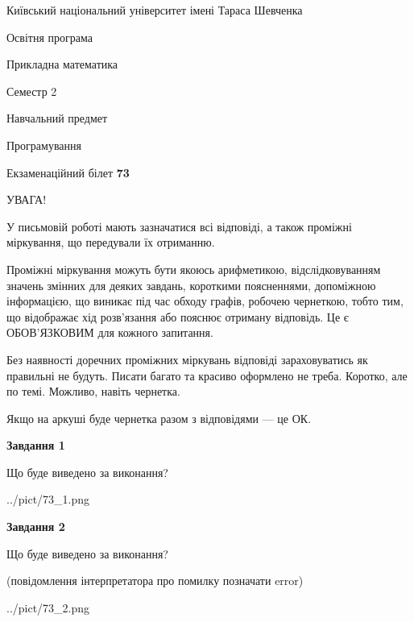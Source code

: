 \documentclass[12pt, ukrainian]{article}
\begin{document}
{{\begin {small}\par
{ \center  Київський національний університет імені Тараса Шевченка \par}
{\parbox {5 cm}{Освітня програма \hfill}{\parbox {7 cm}{Прикладна математика\hfill}}\parbox {6 cm}{\hfill Семестр 2}}\par
{\parbox {5 cm} {Навчальний предмет \hfill}\parbox {7 cm}{Програмування \hfill}\parbox {6cm}{\hfill}\par}\vspace{-7pt} \end{small}}{\center Екзаменаційний білет \No \textbf
{ 73 }\par}}
{
\begin {large}
УВАГА!

У письмовій роботі мають зазначатися всі відповіді, а також проміжні міркування, що передували їх отриманню.

Проміжні міркування можуть бути якоюсь арифметикою, відслідковуванням зна\-чень змінних для деяких завдань,
короткими поясненнями, допоміжною інформацією, що виникає під час обходу графів, робочею чернеткою,
тобто тим, що відображає хід розв’язання або пояснює отриману відповідь.
Це є ОБОВ’ЯЗКОВИМ для кожного запитання.

Без наявності доречних проміжних міркувань відповіді зараховуватись як правиль\-ні не будуть.
Писати багато та красиво оформлено не треба. Коротко, але по темі. Можли\-во, навіть чернетка.

Якщо на аркуші буде чернетка разом з відповідями --- це ОК.

\newpage

{\begin {center}\textbf{Завдання 1}\end {center}}\par
Що буде виведено за виконання?\par
\begin{center}
	{../pict/73_1.png}
\end{center}
\newpage

{\begin {center}\textbf{Завдання 2}\end {center}}\par
Що буде виведено за виконання?\par
 (повідомлення інтерпретатора про помилку позначати error)\par
\begin{center}
	{../pict/73_2.png}
\end{center}
\newpage


\end{large}}
\end{document}
